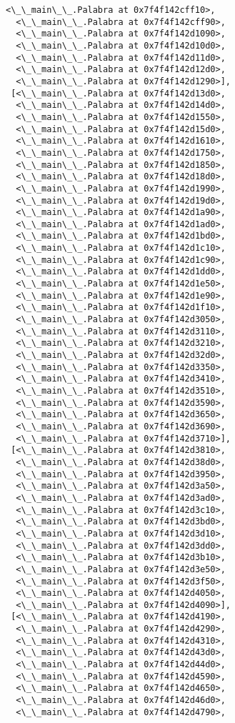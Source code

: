 \documentclass[12pt,a4paper,table]{article}
\begin{document}
\begin{tcolorbox}[breakable, size=fbox, boxrule=.5pt, pad at break*=1mm, opacityfill=0]
\begin{Verbatim}[commandchars=\\\{\}]
  <\_\_main\_\_.Palabra at 0x7f4f142cff10>,
  <\_\_main\_\_.Palabra at 0x7f4f142cff90>,
  <\_\_main\_\_.Palabra at 0x7f4f142d1090>,
  <\_\_main\_\_.Palabra at 0x7f4f142d10d0>,
  <\_\_main\_\_.Palabra at 0x7f4f142d11d0>,
  <\_\_main\_\_.Palabra at 0x7f4f142d12d0>,
  <\_\_main\_\_.Palabra at 0x7f4f142d1290>],
 [<\_\_main\_\_.Palabra at 0x7f4f142d13d0>,
  <\_\_main\_\_.Palabra at 0x7f4f142d14d0>,
  <\_\_main\_\_.Palabra at 0x7f4f142d1550>,
  <\_\_main\_\_.Palabra at 0x7f4f142d15d0>,
  <\_\_main\_\_.Palabra at 0x7f4f142d1610>,
  <\_\_main\_\_.Palabra at 0x7f4f142d1750>,
  <\_\_main\_\_.Palabra at 0x7f4f142d1850>,
  <\_\_main\_\_.Palabra at 0x7f4f142d18d0>,
  <\_\_main\_\_.Palabra at 0x7f4f142d1990>,
  <\_\_main\_\_.Palabra at 0x7f4f142d19d0>,
  <\_\_main\_\_.Palabra at 0x7f4f142d1a90>,
  <\_\_main\_\_.Palabra at 0x7f4f142d1ad0>,
  <\_\_main\_\_.Palabra at 0x7f4f142d1bd0>,
  <\_\_main\_\_.Palabra at 0x7f4f142d1c10>,
  <\_\_main\_\_.Palabra at 0x7f4f142d1c90>,
  <\_\_main\_\_.Palabra at 0x7f4f142d1dd0>,
  <\_\_main\_\_.Palabra at 0x7f4f142d1e50>,
  <\_\_main\_\_.Palabra at 0x7f4f142d1e90>,
  <\_\_main\_\_.Palabra at 0x7f4f142d1f10>,
  <\_\_main\_\_.Palabra at 0x7f4f142d3050>,
  <\_\_main\_\_.Palabra at 0x7f4f142d3110>,
  <\_\_main\_\_.Palabra at 0x7f4f142d3210>,
  <\_\_main\_\_.Palabra at 0x7f4f142d32d0>,
  <\_\_main\_\_.Palabra at 0x7f4f142d3350>,
  <\_\_main\_\_.Palabra at 0x7f4f142d3410>,
  <\_\_main\_\_.Palabra at 0x7f4f142d3510>,
  <\_\_main\_\_.Palabra at 0x7f4f142d3590>,
  <\_\_main\_\_.Palabra at 0x7f4f142d3650>,
  <\_\_main\_\_.Palabra at 0x7f4f142d3690>,
  <\_\_main\_\_.Palabra at 0x7f4f142d3710>],
 [<\_\_main\_\_.Palabra at 0x7f4f142d3810>,
  <\_\_main\_\_.Palabra at 0x7f4f142d38d0>,
  <\_\_main\_\_.Palabra at 0x7f4f142d3950>,
  <\_\_main\_\_.Palabra at 0x7f4f142d3a50>,
  <\_\_main\_\_.Palabra at 0x7f4f142d3ad0>,
  <\_\_main\_\_.Palabra at 0x7f4f142d3c10>,
  <\_\_main\_\_.Palabra at 0x7f4f142d3bd0>,
  <\_\_main\_\_.Palabra at 0x7f4f142d3d10>,
  <\_\_main\_\_.Palabra at 0x7f4f142d3dd0>,
  <\_\_main\_\_.Palabra at 0x7f4f142d3b10>,
  <\_\_main\_\_.Palabra at 0x7f4f142d3e50>,
  <\_\_main\_\_.Palabra at 0x7f4f142d3f50>,
  <\_\_main\_\_.Palabra at 0x7f4f142d4050>,
  <\_\_main\_\_.Palabra at 0x7f4f142d4090>],
 [<\_\_main\_\_.Palabra at 0x7f4f142d4190>,
  <\_\_main\_\_.Palabra at 0x7f4f142d4290>,
  <\_\_main\_\_.Palabra at 0x7f4f142d4310>,
  <\_\_main\_\_.Palabra at 0x7f4f142d43d0>,
  <\_\_main\_\_.Palabra at 0x7f4f142d44d0>,
  <\_\_main\_\_.Palabra at 0x7f4f142d4590>,
  <\_\_main\_\_.Palabra at 0x7f4f142d4650>,
  <\_\_main\_\_.Palabra at 0x7f4f142d46d0>,
  <\_\_main\_\_.Palabra at 0x7f4f142d4790>,

\end{Verbatim}
\end{tcolorbox}
\end{document}

